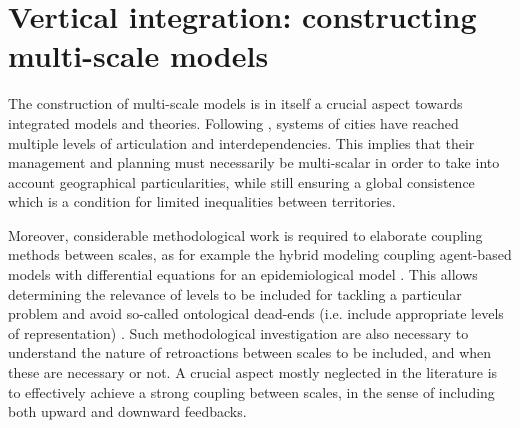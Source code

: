 



\section{Vertical integration: constructing multi-scale models}


The construction of multi-scale models is in itself a crucial aspect towards integrated models and theories. Following \cite{rozenblat2018conclusion}, systems of cities have reached multiple levels of articulation and interdependencies. This implies that their management and planning must necessarily be multi-scalar in order to take into account geographical particularities, while still ensuring a global consistence which is a condition for limited inequalities between territories.


Moreover, considerable methodological work is required to elaborate coupling methods between scales, as for example the hybrid modeling coupling agent-based models with differential equations for an epidemiological model \cite{banos2015coupling}. This allows determining the relevance of levels to be included for tackling a particular problem and avoid so-called ontological dead-ends (i.e. include appropriate levels of representation) \cite{roth2006reconstruction}. Such methodological investigation are also necessary to understand the nature of retroactions between scales to be included, and when these are necessary or not. A crucial aspect mostly neglected in the literature is to effectively achieve a strong coupling between scales, in the sense of including both upward and downward feedbacks.

